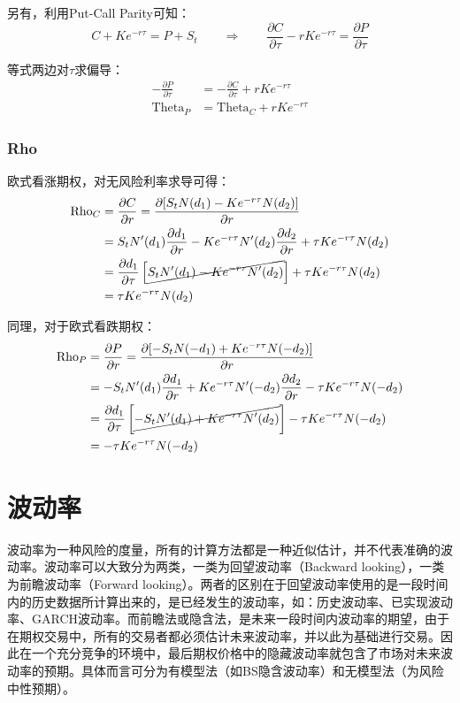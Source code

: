 \documentclass[11pt]{article}
\begin{document}
另有，利用Put-Call Parity可知：
\begin{equation*}
    C + Ke^{-r\tau} = P + S_t \qquad \Rightarrow \qquad \frac{\partial C}{\partial \tau} - rKe^{-r\tau} = \frac{\partial P}{\partial \tau} 
\end{equation*}

等式两边对$\tau$求偏导：
\begin{align*}
    -\frac{\partial P}{\partial \tau} & = -\frac{\partial C}{\partial \tau} + rKe^{-r\tau} \\
    \text{Theta}_P &= \text{Theta}_C + rKe^{-r\tau}
\end{align*}

\subsubsection{Rho}

欧式看涨期权，对无风险利率求导可得：
\begin{align*}
    \text{Rho}_C &= \frac{\partial C}{\partial r} = 
    \frac{\partial [S_t N(d_1) - Ke^{-r\tau} N(d_2)]}{\partial r} \\
    &= S_t N'(d_1) \frac{\partial d_1}{\partial r} - Ke^{-r\tau} N'(d_2)\frac{\partial d_2}{\partial r} + \tau K e^{-r\tau} N(d_2) \\
    &= \frac{\partial d_1}{\partial \tau} \left[\cancel{S_t N'(d_1) - Ke^{-r\tau} N'(d_2) } \right] + \tau K e^{-r\tau} N(d_2) \\
    &= \tau K e^{-r\tau} N(d_2)
\end{align*}

同理，对于欧式看跌期权：
\begin{align*}
    \text{Rho}_P &= \frac{\partial P}{\partial r} = 
    \frac{\partial [-S_t N(-d_1) + Ke^{-r\tau} N(-d_2)]}{\partial r} \\
    &= -S_t N'(d_1) \frac{\partial d_1}{\partial r} + Ke^{-r\tau} N'(-d_2)\frac{\partial d_2}{\partial r} - \tau Ke^{-r\tau} N(-d_2) \\
    &= \frac{\partial d_1}{\partial \tau} \left[\cancel{-S_t N'(d_1) + Ke^{-r\tau} N'(d_2) } \right] - \tau K e^{-r\tau} N(-d_2) \\
    &= -\tau K e^{-r\tau} N(-d_2)
\end{align*}

\section{波动率}

波动率为一种风险的度量，所有的计算方法都是一种近似估计，并不代表准确的波动率。波动率可以大致分为两类，一类为回望波动率（Backward looking），一类为前瞻波动率（Forward looking）。两者的区别在于回望波动率使用的是一段时间内的历史数据所计算出来的，是已经发生的波动率，如：历史波动率、已实现波动率、GARCH波动率。而前瞻法或隐含法，是未来一段时间内波动率的期望，由于在期权交易中，所有的交易者都必须估计未来波动率，并以此为基础进行交易。因此在一个充分竞争的环境中，最后期权价格中的隐藏波动率就包含了市场对未来波动率的预期。具体而言可分为有模型法（如BS隐含波动率）和无模型法（为风险中性预期）。
\end{document}
